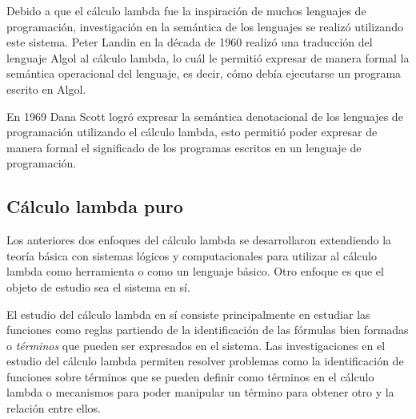 Debido a que el cálculo lambda fue la inspiración de muchos lenguajes de
programación, investigación en la semántica de los lenguajes se realizó
utilizando este sistema. Peter Landin en la década de 1960 realizó una
traducción del lenguaje Algol al cálculo lambda, lo cuál le permitió expresar de
manera formal la semántica operacional del lenguaje, es decir, cómo debía
ejecutarse un programa escrito en Algol.\

En 1969 Dana Scott logró expresar la semántica denotacional de los lenguajes de
programación utilizando el cálculo lambda, esto permitió poder expresar de
manera formal el significado de los programas escritos en un lenguaje de
programación.\

\subsection{Cálculo lambda puro}

Los anteriores dos enfoques del cálculo lambda se desarrollaron extendiendo la
teoría básica con sistemas lógicos y computacionales para utilizar al cálculo
lambda como herramienta o como un lenguaje básico. Otro enfoque es que el objeto
de estudio sea el sistema en sí.\

El estudio del cálculo lambda en sí consiste principalmente en estudiar las
funciones como reglas partiendo de la identificación de las fórmulas bien
formadas o \emph{términos} que pueden ser expresados en el sistema. Las
investigaciones en el estudio del cálculo lambda permiten resolver problemas
como la identificación de funciones sobre términos que se pueden definir como
términos en el cálculo lambda o mecanismos para poder manipular un término para
obtener otro y la relación entre ellos.


